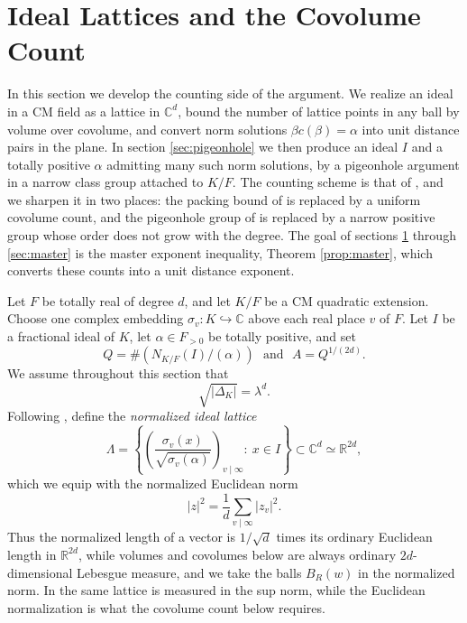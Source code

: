 \section{Ideal Lattices and the Covolume Count}\label{sec:geometry}

In this section we develop the counting side of the argument. We realize an ideal in a CM field as a lattice in $\mathbb{C}^d$, bound the number of lattice points in any ball by volume over covolume, and convert norm solutions $\beta c(\beta)=\alpha$ into unit distance pairs in the plane. In section \ref{sec:pigeonhole} we then produce an ideal $I$ and a totally positive $\alpha$ admitting many such norm solutions, by a pigeonhole argument in a narrow class group attached to $K/F$.  The counting scheme is that of \cite[Lemmas 2 through 8]{Sawin}, and we sharpen it in two places: the packing bound of \cite[Lemma 2]{Sawin} is replaced by a uniform covolume count, and the pigeonhole group of \cite[Lemma 6]{Sawin} is replaced by a narrow positive group whose order does not grow with the degree.  The goal of sections \ref{sec:geometry} through \ref{sec:master} is the master exponent inequality, Theorem \ref{prop:master}, which converts these counts into a unit distance exponent.

Let $F$ be totally real of degree $d$, and let $K/F$ be a CM quadratic extension.  Choose one complex embedding $\sigma_v:K\hookrightarrow\mathbb{C}$ above each real place $v$ of $F$.  Let $I$ be a fractional ideal of $K$, let $\alpha\in F_{>0}$ be totally positive, and set
\[
   Q=\#\left(N_{K/F}(I)/(\alpha)\right)
   \ \ \ \text{and}\ \ \ A=Q^{1/(2d)}.
\]
We assume throughout this section that
\begin{equation}\label{eq:abs-root}
   \sqrt{|\Delta_K|}=\lambda^d.
\end{equation}
Following \cite[Lemma 4]{Sawin}, define the \emph{normalized ideal lattice}
\begin{equation}\label{eq:lattice}
   \Lambda=\left\{\left(\frac{\sigma_v(x)}{\sqrt{\sigma_v(\alpha)}}\right)_{v\mid\infty}:\ x\in I\right\}
   \subset \mathbb{C}^d\simeq\mathbb{R}^{2d},
\end{equation}
which we equip with the normalized Euclidean norm
\[
   |z|^2=\frac1d\sum_{v\mid\infty}|z_v|^2.
\]
Thus the normalized length of a vector is $1/\sqrt d$ times its ordinary Euclidean length in $\mathbb{R}^{2d}$, while volumes and covolumes below are always ordinary $2d$-dimensional Lebesgue measure, and we take the balls $B_R(w)$ in the normalized norm.  In \cite[Lemma 4]{Sawin} the same lattice is measured in the sup norm, while the Euclidean normalization is what the covolume count below requires.

